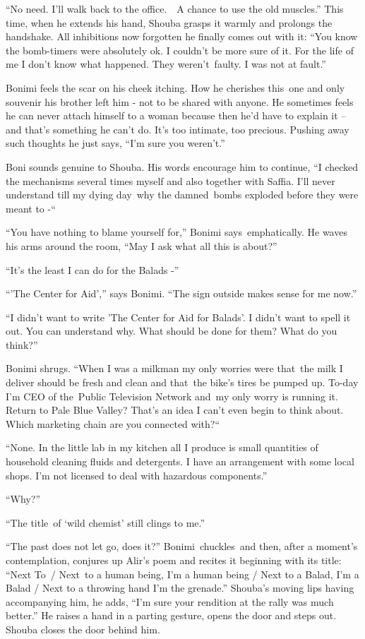 \documentclass[twoside,11pt]{book}
\begin{document}
``No need. I'll walk back to the office.\ \ A chance to use the old muscles.'' This time, when
he extends his hand, Shouba grasps it warmly and prolongs the handshake. All inhibitions now forgotten he finally comes
out with it: ``You know the bomb-timers were absolutely ok. I couldn't be more sure of it. For the life of
me I don't know what happened. They weren't~faulty. I was not at fault.''

Bonimi feels the scar on his cheek itching. How he cherishes this~one and only souvenir his brother left him - not to be
shared with anyone. He sometimes feels he can never attach himself to a woman because then he'd have to explain it --
and that's something he can't do. It's too intimate, too precious. Pushing away such thoughts he just says,
``I'm sure you weren't.''

Boni sounds genuine to Shouba. His words encourage him to continue, ``I checked the mechanisms several
times myself and also together with Saffia. I'll never understand till my dying
day{\ }why the damned{\ }bombs exploded
before they were meant to -``\ 

``You have nothing to blame yourself for,'' Bonimi says~emphatically. He waves his arms around
the room, ``May I ask what all this is about?''

``It's the least I can do for the Balads -''

``'The Center for Aid','' says Bonimi. ``The sign outside makes sense for me
now.''

``I didn't want to write 'The Center for Aid for Balads'. I didn't want to spell it out. You can understand
why. What should be done for them? What do you think?''

Bonimi shrugs. ``When I was a milkman my only worries were that~the milk I deliver should be fresh and
clean and that~the bike's tires be pumped up. To-day I'm CEO of the~Public Television Network and~my only worry is
running it.~ Return to Pale Blue Valley? That's an idea I can't even begin to think about. Which marketing chain are
you connected with?``\ 

``None. In the little lab in my kitchen all I produce is small quantities of household cleaning fluids and
detergents. I have an arrangement with some local shops. I'm not licensed to deal with hazardous
components.'' 

``Why?''

``The title~of {}`wild chemist' still clings to me.'' 

``The past does not let go, does it?'' Bonimi~chuckles\ and then, after a moment's
contemplation, conjures up Alir's poem and recites it beginning with its title: ``Next To\ / Next~to a
human being, I'm a human being / Next to a Balad, I'm a Balad / Next to a throwing hand I'm the grenade.''
Shouba's moving lips having accompanying him, he adds, ``I'm sure your rendition at the rally was much
better.'' He raises a hand in a parting gesture, opens the door and steps out. Shouba closes the door
behind him.
\end{document}
